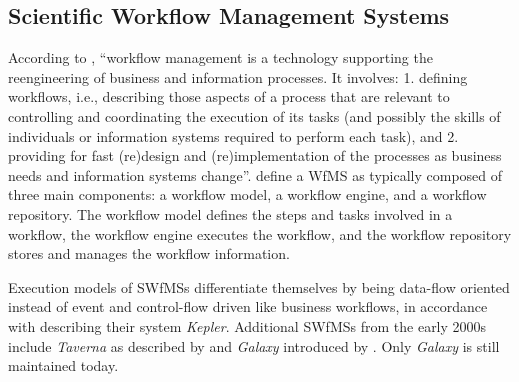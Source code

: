 \subsection{Scientific Workflow Management Systems}\label{subsec:literature_review_swfms}
According to \citeauthor{georgakopoulos1995} \autocite{georgakopoulos1995}, \enquote{workflow management is a technology supporting the reengineering of business and information processes. It involves: 1. defining workflows, i.e., describing those aspects of a process that are relevant to controlling and coordinating the execution of its tasks (and possibly the skills of individuals or information systems required to perform each task), and 2. providing for fast (re)design and (re)implementation of the processes as business needs and information systems change}. \citeauthor{aalst2004} \autocite{georgakopoulos1995} define a \ac{WfMS} as typically composed of three main components: a workflow model, a workflow engine, and a workflow repository. The workflow model defines the steps and tasks involved in a workflow, the workflow engine executes the workflow, and the workflow repository stores and manages the workflow information.

Execution models of \acp{SWfMS} differentiate themselves by being data-flow oriented instead of event and control-flow driven like business workflows, in accordance with \citeauthor{ludascher2006} \autocite{ludascher2006} describing their system \textit{Kepler}. Additional \acp{SWfMS} from the early 2000s include \textit{Taverna} as described by \citeauthor{oinn2004} \autocite{oinn2004} and \textit{Galaxy} introduced by \citeauthor{giardine2005} \autocite{giardine2005}. Only \textit{Galaxy} is still maintained today.

